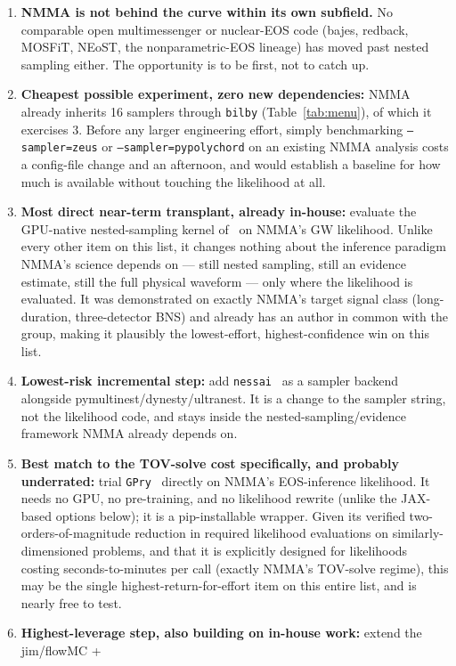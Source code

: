 \documentclass[11pt]{article}
\newcommand{\code}[1]{\texttt{#1}}
\begin{document}
\begin{enumerate}[leftmargin=1.4em]
\item \textbf{NMMA is not behind the curve within its own subfield.} No comparable open
multimessenger or nuclear-EOS code (bajes, redback, MOSFiT, NEoST, the nonparametric-EOS
lineage) has moved past nested sampling either. The opportunity is to be first, not to catch
up.
\item \textbf{Cheapest possible experiment, zero new dependencies:} NMMA already inherits 16
samplers through \code{bilby} (Table~\ref{tab:menu}), of which it exercises 3. Before any
larger engineering effort, simply benchmarking \code{--sampler=zeus} or
\code{--sampler=pypolychord} on an existing NMMA analysis costs a config-file change and an
afternoon, and would establish a baseline for how much is available without touching the
likelihood at all.
\item \textbf{Most direct near-term transplant, already in-house:} evaluate the GPU-native
nested-sampling kernel of~\cite{Yallup:2026nqc} on NMMA's GW likelihood. Unlike every other
item on this list, it changes nothing about the inference paradigm NMMA's science depends on
--- still nested sampling, still an evidence estimate, still the full physical waveform ---
only where the likelihood is evaluated. It was demonstrated on exactly NMMA's target signal
class (long-duration, three-detector BNS) and already has an author in common with the group,
making it plausibly the lowest-effort, highest-confidence win on this list.
\item \textbf{Lowest-risk incremental step:} add \code{nessai}~\cite{Williams:2021qyt} as a
sampler backend alongside pymultinest/dynesty/ultranest. It is a change to the sampler
string, not the likelihood code, and stays inside the nested-sampling/evidence framework NMMA
already depends on.
\item \textbf{Best match to the TOV-solve cost specifically, and probably underrated:} trial
\code{GPry}~\cite{Gammal:2022eob} directly on NMMA's EOS-inference likelihood. It needs no
GPU, no pre-training, and no likelihood rewrite (unlike the JAX-based options below); it is a
pip-installable wrapper. Given its verified two-orders-of-magnitude reduction in required
likelihood evaluations on similarly-dimensioned problems, and that it is explicitly designed
for likelihoods costing seconds-to-minutes per call (exactly NMMA's TOV-solve regime), this
may be the single highest-return-for-effort item on this entire list, and is nearly free to
test.
\item \textbf{Highest-leverage step, also building on in-house work:} extend the jim/flowMC +

\end{enumerate}
\end{document}
